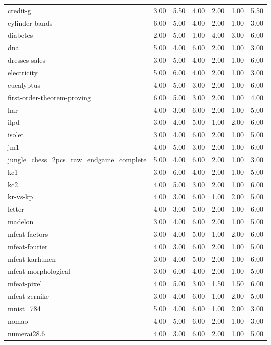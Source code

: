 \begin{table}[htbp]
\begin{tabular}{lrrrrrr}
credit-g & 3.00 & 5.50 & 4.00 & 2.00 & 1.00 & 5.50 \\
cylinder-bands & 6.00 & 5.00 & 4.00 & 2.00 & 1.00 & 3.00 \\
diabetes & 2.00 & 5.00 & 1.00 & 4.00 & 3.00 & 6.00 \\
dna & 5.00 & 4.00 & 6.00 & 2.00 & 1.00 & 3.00 \\
dresses-sales & 3.00 & 5.00 & 4.00 & 2.00 & 1.00 & 6.00 \\
electricity & 5.00 & 6.00 & 4.00 & 2.00 & 1.00 & 3.00 \\
eucalyptus & 4.00 & 5.00 & 3.00 & 2.00 & 1.00 & 6.00 \\
first-order-theorem-proving & 6.00 & 5.00 & 3.00 & 2.00 & 1.00 & 4.00 \\
har & 4.00 & 3.00 & 6.00 & 2.00 & 1.00 & 5.00 \\
ilpd & 3.00 & 4.00 & 5.00 & 1.00 & 2.00 & 6.00 \\
isolet & 3.00 & 4.00 & 6.00 & 2.00 & 1.00 & 5.00 \\
jm1 & 4.00 & 5.00 & 3.00 & 2.00 & 1.00 & 6.00 \\
jungle\_chess\_2pcs\_raw\_endgame\_complete & 5.00 & 4.00 & 6.00 & 2.00 & 1.00 & 3.00 \\
kc1 & 3.00 & 6.00 & 4.00 & 2.00 & 1.00 & 5.00 \\
kc2 & 4.00 & 5.00 & 3.00 & 2.00 & 1.00 & 6.00 \\
kr-vs-kp & 4.00 & 3.00 & 6.00 & 1.00 & 2.00 & 5.00 \\
letter & 4.00 & 3.00 & 5.00 & 2.00 & 1.00 & 6.00 \\
madelon & 3.00 & 4.00 & 6.00 & 2.00 & 1.00 & 5.00 \\
mfeat-factors & 3.00 & 4.00 & 5.00 & 1.00 & 2.00 & 6.00 \\
mfeat-fourier & 4.00 & 3.00 & 6.00 & 2.00 & 1.00 & 5.00 \\
mfeat-karhunen & 3.00 & 4.00 & 5.00 & 2.00 & 1.00 & 6.00 \\
mfeat-morphological & 3.00 & 6.00 & 4.00 & 2.00 & 1.00 & 5.00 \\
mfeat-pixel & 4.00 & 5.00 & 3.00 & 1.50 & 1.50 & 6.00 \\
mfeat-zernike & 3.00 & 4.00 & 6.00 & 1.00 & 2.00 & 5.00 \\
mnist\_784 & 5.00 & 4.00 & 6.00 & 1.00 & 2.00 & 3.00 \\
nomao & 4.00 & 5.00 & 6.00 & 2.00 & 1.00 & 3.00 \\
numerai28.6 & 4.00 & 3.00 & 6.00 & 2.00 & 1.00 & 5.00 \\

\end{tabular}
\end{table}
